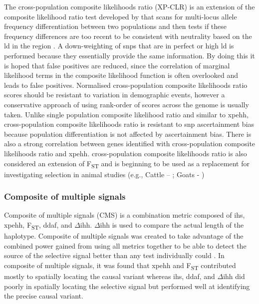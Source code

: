 \documentclass[]{report}
\begin{document}
The cross-population composite likelihoods ratio (XP-CLR) is an
extension of the composite likelihood ratio test developed by
\citet{Nielsen2009} that scans for multi-locus allele frequency
differentiation between two populations and then tests if these
frequency differences are too recent to be consistent with neutrality
based on the \gls{ld} in the region \citep{Chen2010}. A down-weighting
of \glspl{snp} that are in perfect or high \gls{ld} is performed because
they essentially provide the same information. By doing this it is hoped
that false positives are reduced, since the correlation of marginal
likelihood terms in the composite likelihood function is often
overlooked and leads to false positives. Normalised cross-population
composite likelihoods ratio scores should be resistant to variation in
demographic events, however a conservative approach of using rank-order
of scores across the genome is usually taken. Unlike single population
composite likelihood ratio and similar to \gls{xpehh}, cross-population
composite likelihoods ratio is resistant to \gls{snp} ascertainment bias
because population differentiation is not affected by ascertainment
bias. There is also a strong correlation between genes identified with
cross-population composite likelihoods ratio and \gls{xpehh}.
cross-population composite likelihoods ratio is also considered an
extension of F\textsubscript{ST} and is beginning to be used as a
replacement for investigating selection in animal studies (e.g., Cattle
-- \citet{Lee2014}; Goats - \citet{Benjelloun2015})

\subsubsection{Composite of multiple
signals}\label{composite-of-multiple-signals}

Composite of multiple signals (CMS) is a combination metric composed of
\gls{ihs}, \gls{xpehh}, F\textsubscript{ST}, \gls{ddaf}, and
\(\Delta\)\gls{ihh}. \(\Delta\)\gls{ihh} is used to compare the actual
length of the haplotype. Composite of multiple signals was created to
take advantage of the combined power gained from using all metrics
together to be able to detect the source of the selective signal better
than any test individually could \citep{Grossman2010}. In composite of
multiple signals, it was found that \gls{xpehh} and F\textsubscript{ST}
contributed mostly to spatially locating the causal variant whereas
\gls{ihs}, \gls{ddaf}, and \(\Delta\)\gls{ihh} did poorly in spatially
locating the selective signal but performed well at identifying the
precise causal variant.
\end{document}
